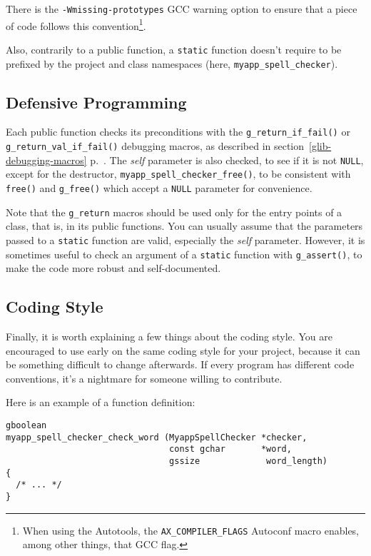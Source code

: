 There is the \texttt{-Wmissing-prototypes} GCC warning option to ensure that a piece of code follows this convention\footnote{When using the Autotools, the \texttt{AX\_COMPILER\_FLAGS} Autoconf macro enables, among other things, that GCC flag.}.

Also, contrarily to a public function, a \lstinline{static} function doesn't require to be prefixed by the project and class namespaces (here, \lstinline{myapp_spell_checker}).

\subsection{Defensive Programming}
Each public function checks its preconditions with the \lstinline{g_return_if_fail()} or \lstinline{g_return_val_if_fail()} debugging macros, as described in section~\ref{glib-debugging-macros} p.~\pageref{glib-debugging-macros}. The \emph{self} parameter is also checked, to see if it is not \lstinline{NULL}, except for the destructor, \lstinline{myapp_spell_checker_free()}, to be consistent with \lstinline{free()} and \lstinline{g_free()} which accept a \lstinline{NULL} parameter for convenience.

Note that the \lstinline{g_return} macros should be used only for the entry points of a class, that is, in its public functions. You can usually assume that the parameters passed to a \lstinline{static} function are valid, especially the \emph{self} parameter. However, it is sometimes useful to check an argument of a \lstinline{static} function with \lstinline{g_assert()}, to make the code more robust and self-documented.

\subsection{Coding Style}
Finally, it is worth explaining a few things about the coding style. You are encouraged to use early on the same coding style for your project, because it can be something difficult to change afterwards. If every program has different code conventions, it's a nightmare for someone willing to contribute.

Here is an example of a function definition:
\begin{lstlisting}
gboolean
myapp_spell_checker_check_word (MyappSpellChecker *checker,
                                const gchar       *word,
                                gssize             word_length)
{
  /* ... */
}
\end{lstlisting}


